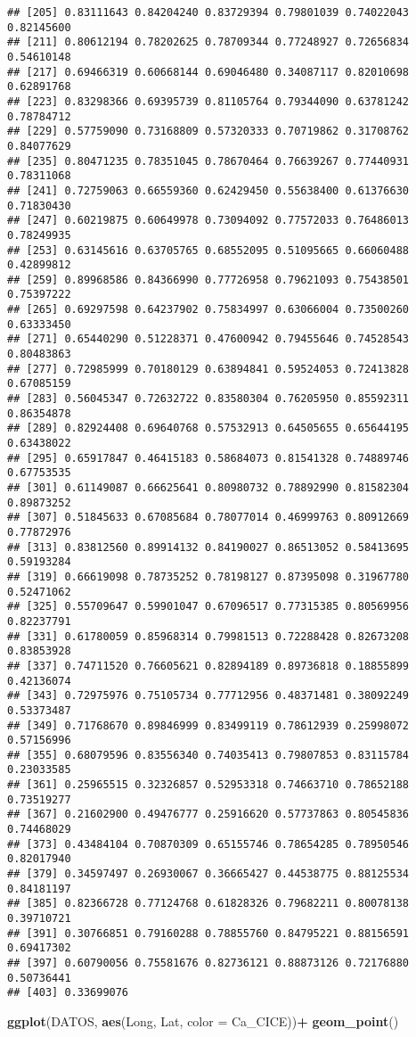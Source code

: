 \documentclass[
]{article}
\newenvironment{Shaded}{\begin{snugshade}}{\end{snugshade}}
\newcommand{\DataTypeTok}[1]{\textcolor[rgb]{0.13,0.29,0.53}{#1}}
\newcommand{\KeywordTok}[1]{\textcolor[rgb]{0.13,0.29,0.53}{\textbf{#1}}}
\newcommand{\NormalTok}[1]{#1}
\newcommand{\OperatorTok}[1]{\textcolor[rgb]{0.81,0.36,0.00}{\textbf{#1}}}
\newcommand{\StringTok}[1]{\textcolor[rgb]{0.31,0.60,0.02}{#1}}
\begin{document}
\begin{verbatim}
## [205] 0.83111643 0.84204240 0.83729394 0.79801039 0.74022043 0.82145600
## [211] 0.80612194 0.78202625 0.78709344 0.77248927 0.72656834 0.54610148
## [217] 0.69466319 0.60668144 0.69046480 0.34087117 0.82010698 0.62891768
## [223] 0.83298366 0.69395739 0.81105764 0.79344090 0.63781242 0.78784712
## [229] 0.57759090 0.73168809 0.57320333 0.70719862 0.31708762 0.84077629
## [235] 0.80471235 0.78351045 0.78670464 0.76639267 0.77440931 0.78311068
## [241] 0.72759063 0.66559360 0.62429450 0.55638400 0.61376630 0.71830430
## [247] 0.60219875 0.60649978 0.73094092 0.77572033 0.76486013 0.78249935
## [253] 0.63145616 0.63705765 0.68552095 0.51095665 0.66060488 0.42899812
## [259] 0.89968586 0.84366990 0.77726958 0.79621093 0.75438501 0.75397222
## [265] 0.69297598 0.64237902 0.75834997 0.63066004 0.73500260 0.63333450
## [271] 0.65440290 0.51228371 0.47600942 0.79455646 0.74528543 0.80483863
## [277] 0.72985999 0.70180129 0.63894841 0.59524053 0.72413828 0.67085159
## [283] 0.56045347 0.72632722 0.83580304 0.76205950 0.85592311 0.86354878
## [289] 0.82924408 0.69640768 0.57532913 0.64505655 0.65644195 0.63438022
## [295] 0.65917847 0.46415183 0.58684073 0.81541328 0.74889746 0.67753535
## [301] 0.61149087 0.66625641 0.80980732 0.78892990 0.81582304 0.89873252
## [307] 0.51845633 0.67085684 0.78077014 0.46999763 0.80912669 0.77872976
## [313] 0.83812560 0.89914132 0.84190027 0.86513052 0.58413695 0.59193284
## [319] 0.66619098 0.78735252 0.78198127 0.87395098 0.31967780 0.52471062
## [325] 0.55709647 0.59901047 0.67096517 0.77315385 0.80569956 0.82237791
## [331] 0.61780059 0.85968314 0.79981513 0.72288428 0.82673208 0.83853928
## [337] 0.74711520 0.76605621 0.82894189 0.89736818 0.18855899 0.42136074
## [343] 0.72975976 0.75105734 0.77712956 0.48371481 0.38092249 0.53373487
## [349] 0.71768670 0.89846999 0.83499119 0.78612939 0.25998072 0.57156996
## [355] 0.68079596 0.83556340 0.74035413 0.79807853 0.83115784 0.23033585
## [361] 0.25965515 0.32326857 0.52953318 0.74663710 0.78652188 0.73519277
## [367] 0.21602900 0.49476777 0.25916620 0.57737863 0.80545836 0.74468029
## [373] 0.43484104 0.70870309 0.65155746 0.78654285 0.78950546 0.82017940
## [379] 0.34597497 0.26930067 0.36665427 0.44538775 0.88125534 0.84181197
## [385] 0.82366728 0.77124768 0.61828326 0.79682211 0.80078138 0.39710721
## [391] 0.30766851 0.79160288 0.78855760 0.84795221 0.88156591 0.69417302
## [397] 0.60790056 0.75581676 0.82736121 0.88873126 0.72176880 0.50736441
## [403] 0.33699076
\end{verbatim}

\begin{Shaded}
\begin{Highlighting}[]
\KeywordTok{ggplot}\NormalTok{(DATOS, }\KeywordTok{aes}\NormalTok{(Long, Lat, }\DataTypeTok{color =}\NormalTok{ Ca_CICE))}\OperatorTok{+}
\StringTok{  }\KeywordTok{geom_point}\NormalTok{()}
\end{Highlighting}
\end{Shaded}
\end{document}
